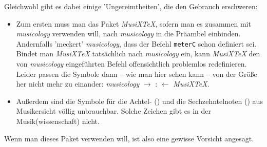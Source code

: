 Gleichwohl gibt es dabei einige 'Ungereimtheiten', die den Gebrauch erschweren:
\begin{itemize}
  \item Zum ersten muss man das Paket \textit{MusiX\TeX}, sofern man es zusammen
  mit \textit{musicology} verwenden will, nach \textit{musicology} in die Präambel
  einbinden. Andernfalls 'meckert' \textit{musicology}, dass der Befehl
  \texttt{meterC} schon definiert sei. Bindet man \textit{MusiX\TeX} tatsächlich
  nach \textit{musicology} ein, kann \textit{MusiX\TeX} den von \textit{musicology}
  eingeführten Befehl offensichtlich problemlos redefinieren. Leider passen die
  Symbole dann -- wie man hier sehen kann -- von der Größe her nicht mehr zu
  einander: \textit{musicology} $\rightarrow$ \meterCutC : \meterC $\leftarrow$
  \textit{MusiX\TeX}.
  \item Außerdem sind die Symbole für die Achtel- (\musEighth) und die
  Sechzehntelnoten (\musSixteenth) aus Musikersicht völlig unbrauchbar. Solche
  Zeichen gibt es in der Musik(wissenschaft) nicht.
\end{itemize}

Wenn man dieses Paket verwenden will, ist also eine gewisse Vorsicht angesagt.


%
